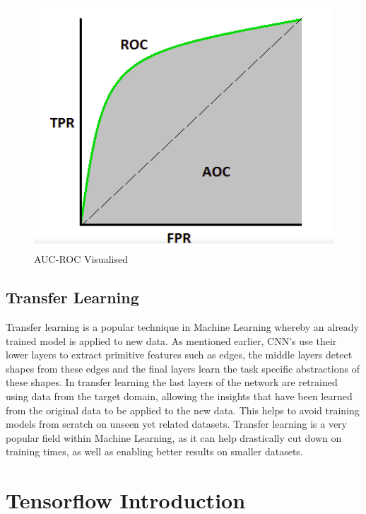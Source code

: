 \documentclass[12pt]{report}
\begin{document}
\vspace{0.5cm}
\begin{figure}[h]
	\centering
	\includegraphics[width=12cm]{aucroc}
	\caption{AUC-ROC Visualised}
	\label{fig:aucroc}
\end{figure}

\subsection{Transfer Learning}
\begin{flushleft}
Transfer learning is a popular technique in Machine Learning whereby an already trained model is applied to new data. As mentioned earlier, CNN's use their lower layers to extract primitive features such as edges, the middle layers detect shapes from these edges and the final layers learn the task specific abstractions of these shapes. In transfer learning the last layers of the network are retrained using data from the target domain, allowing the insights that have been learned from the original data to be applied to the new data. This helps to avoid training models from scratch on unseen yet related datasets. Transfer learning is a very popular field within Machine Learning, as it can help drastically cut down on training times, as well as enabling better results on smaller datasets.
\end{flushleft}

\newpage
\section{Tensorflow Introduction}
\end{document}

